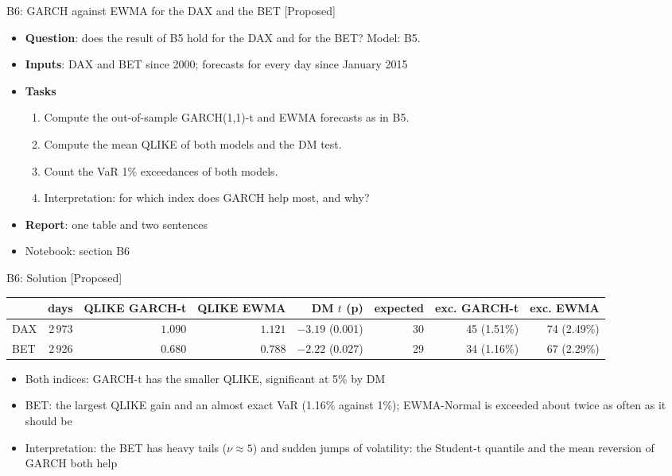 \begin{frame}{B6: GARCH against EWMA for the DAX and the BET [Proposed]}
\itemsize{\footnotesize}
\begin{itemize}
\item \textbf{Question}: does the result of B5 hold for the DAX and for the BET? Model: B5.
\item \textbf{Inputs}: DAX and BET since 2000; forecasts for every day since January 2015
\item \textbf{Tasks}
\begin{enumerate}
    \item Compute the out-of-sample GARCH(1,1)-t and EWMA forecasts as in B5.
    \item Compute the mean QLIKE of both models and the DM test.
    \item Count the VaR 1\% exceedances of both models.
    \item Interpretation: for which index does GARCH help most, and why?
\end{enumerate}
\item \textbf{Report}: one table and two sentences
\item Notebook: section B6
\end{itemize}
\end{frame}

\ifsolutions
\begin{frame}{B6: Solution [Proposed]}
\itemsize{\footnotesize}
\begin{center}
\scriptsize
\begin{tabular}{lrrrrrrr}
\toprule
& days & QLIKE GARCH-t & QLIKE EWMA & DM $t$ (p) & expected & exc. GARCH-t & exc. EWMA \\
\midrule
DAX & 2\,973 & $1.090$ & $1.121$ & ${-3.19}$ (0.001) & 30 & 45 (1.51\%) & 74 (2.49\%) \\
BET & 2\,926 & $0.680$ & $0.788$ & ${-2.22}$ (0.027) & 29 & 34 (1.16\%) & 67 (2.29\%) \\
\bottomrule
\end{tabular}
\end{center}
\begin{itemize}
    \item Both indices: GARCH-t has the smaller QLIKE, significant at 5\% by DM
    \item BET: the largest QLIKE gain and an almost exact VaR (1.16\% against 1\%); EWMA-Normal is exceeded about twice as often as it should be
    \item Interpretation: the BET has heavy tails ($\nu \approx 5$) and sudden jumps of volatility: the Student-t quantile and the mean reversion of GARCH both help
\end{itemize}
\end{frame}
\fi


